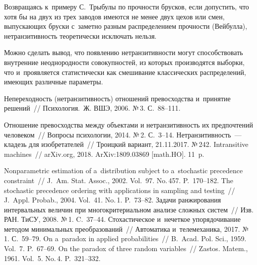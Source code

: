 \begin{multicols}{2}
Возвращаясь к~примеру С.~Трыбулы по проч\-ности брусков, если допустить, что хотя бы на
двух из трех заводов имеются не менее двух цехов или смен, выпускающих бруски с~заметно разным
распределением прочности (Вейбулла), нетранзитивность теоретически исключать нельзя.

Можно сделать вывод, что появлению нетранзитивности могут способствовать внутренние
неоднородности совокупностей, из которых производятся выборки, что и~проявляется статистически
как смешивание классических распределений, имеющих различные параметры.



{\small\frenchspacing
 {%
 \begin{thebibliography}{99}
 
 
 Непереходность (нетранзитивность) отношений
превосходства и~принятие решений~// Психология.~Ж. ВШЭ, 2006. №\,3. С.~88--111.

 Отношение превосходства между объектами
и нетранзитивность их предпочтений человеком~// 
Вопросы психологии, 2014. №\,2. С.~3--14.
 Нетранзитивность~--- кладезь для изобретателей~//
Троицкий вариант,  21.11.2017. №\,242.
 Intransitive machines~// 
arXiv.org, 2018. ArXiv:1809.03869 [math.HO]. 11~p.

 Nonparametric estimation of 
a~distribution subject to a~stochastic precedence constraint~// 
J.~Am. Stat. Assoc., 2002. Vol.~97. No.\,457. P.~170--182.
The stochastic precedence ordering with applications
in sampling and testing~// J.~Appl. Probab., 2004. Vol.~41. No.\,1. P.~73--82.
 Задачи ранжирования интервальных величин при многокритериальном
анализе сложных систем~// Изв. РАН. ТиСУ, 2008. №\,1. C.~37--44.
Стохастическое и~нечеткое упорядочивание методом минимальных преобразований~// 
Автоматика и~телемеханика, 2017. №\,1. С.~59--79.
On a~paradox in applied probabilities~// B.~Acad. Pol.
 Sci., 1959. Vol.~7. P.~67--69.
 On the paradox of three random variables~// Zastos. Matem., 
1961. Vol.~5. No.\,4. P.~321--332.


\end{thebibliography}}}
\end{multicols}
